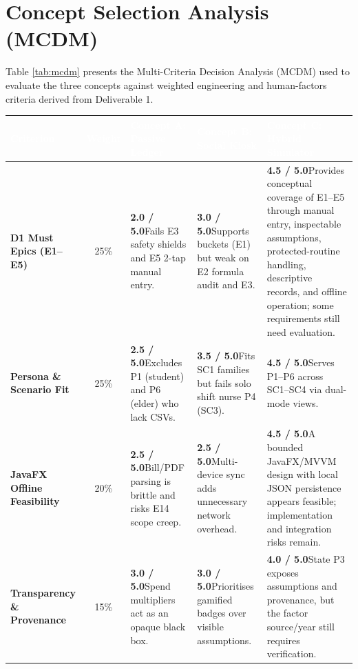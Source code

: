 \documentclass[12pt, a4paper]{article}
\begin{document}
\section{Concept Selection Analysis (MCDM)}
Table \ref{tab:mcdm} presents the Multi-Criteria Decision Analysis (MCDM) used to evaluate the three concepts against weighted engineering and human-factors criteria derived from Deliverable 1.

\begin{table}[H]
\centering
\small
\renewcommand{\arraystretch}{1.45}
\begin{tabularx}{\textwidth}{@{} >{\bfseries}p{3.0cm} c X X X @{}}
\toprule
\rowcolor{AcademicNavy}
\textcolor{white}{Criterion} & \textcolor{white}{Weight} & \textcolor{white}{Concept A: Passive Ledger} & \textcolor{white}{Concept B: Social Kiosk} & \textcolor{white}{Concept C: Hybrid Simulator} \\
\midrule
D1 Must Epics (E1--E5) & 25\% & \textbf{2.0 / 5.0}\newline Fails E3 safety shields and E5 2-tap manual entry. & \textbf{3.0 / 5.0}\newline Supports buckets (E1) but weak on E2 formula audit and E3. & \textbf{4.5 / 5.0}\newline Provides conceptual coverage of E1--E5 through manual entry, inspectable assumptions, protected-routine handling, descriptive records, and offline operation; some requirements still need evaluation. \\
\rowcolor{RowAlt}
Persona \& Scenario Fit & 25\% & \textbf{2.5 / 5.0}\newline Excludes P1 (student) and P6 (elder) who lack CSVs. & \textbf{3.5 / 5.0}\newline Fits SC1 families but fails solo shift nurse P4 (SC3). & \textbf{4.5 / 5.0}\newline Serves P1--P6 across SC1--SC4 via dual-mode views. \\
JavaFX Offline Feasibility & 20\% & \textbf{2.5 / 5.0}\newline Bill/PDF parsing is brittle and risks E14 scope creep. & \textbf{2.5 / 5.0}\newline Multi-device sync adds unnecessary network overhead. & \textbf{4.5 / 5.0}\newline A bounded JavaFX/MVVM design with local JSON persistence appears feasible; implementation and integration risks remain. \\
\rowcolor{RowAlt}
Transparency \& Provenance & 15\% & \textbf{3.0 / 5.0}\newline Spend multipliers act as an opaque black box. & \textbf{3.0 / 5.0}\newline Prioritises gamified badges over visible assumptions. & \textbf{4.0 / 5.0}\newline State P3 exposes assumptions and provenance, but the factor source/year still requires verification. \\

\end{tabularx}
\end{table}
\end{document}
